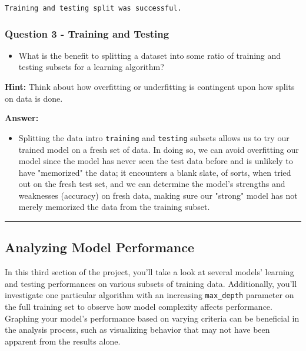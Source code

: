 \documentclass[11pt]{article}
\providecommand{\tightlist}{%
      \setlength{\itemsep}{0pt}\setlength{\parskip}{0pt}}
\begin{document}
    \begin{Verbatim}[commandchars=\\\{\}]
Training and testing split was successful.

    \end{Verbatim}

    \subsubsection{Question 3 - Training and
Testing}\label{question-3---training-and-testing}

\begin{itemize}
\tightlist
\item
  What is the benefit to splitting a dataset into some ratio of training
  and testing subsets for a learning algorithm?
\end{itemize}

\textbf{Hint:} Think about how overfitting or underfitting is contingent
upon how splits on data is done.

    \textbf{Answer: }

\begin{itemize}
\tightlist
\item
  Splitting the data intro \texttt{training} and \texttt{testing}
  subsets allows us to try our trained model on a fresh set of data. In
  doing so, we can avoid overfitting our model since the model has never
  seen the test data before and is unlikely to have "memorized" the
  data; it encounters a blank slate, of sorts, when tried out on the
  fresh test set, and we can determine the model's strengths and
  weaknesses (accuracy) on fresh data, making sure our "strong" model
  has not merely memorized the data from the training subset.
\end{itemize}

    \begin{center}\rule{0.5\linewidth}{\linethickness}\end{center}

\subsection{Analyzing Model
Performance}\label{analyzing-model-performance}

In this third section of the project, you'll take a look at several
models' learning and testing performances on various subsets of training
data. Additionally, you'll investigate one particular algorithm with an
increasing \texttt{\textquotesingle{}max\_depth\textquotesingle{}}
parameter on the full training set to observe how model complexity
affects performance. Graphing your model's performance based on varying
criteria can be beneficial in the analysis process, such as visualizing
behavior that may not have been apparent from the results alone.
\end{document}
